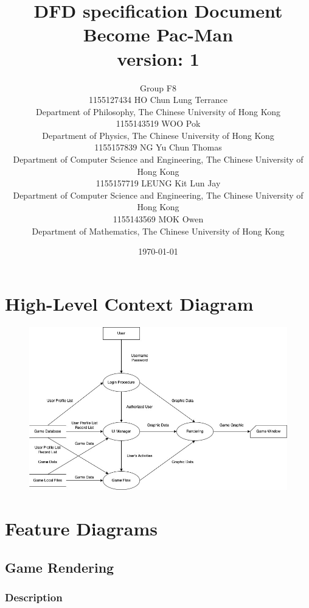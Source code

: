 \documentclass[11pt]{article}
\title{DFD specification Document\\Become Pac-Man\\version: 1}
\author{Group F8\\1155127434 HO Chun Lung Terrance\\
Department of Philosophy, The Chinese University of Hong Kong\\1155143519 WOO Pok\\
Department of Physics, The Chinese University of Hong Kong\\1155157839 NG Yu Chun Thomas\\
Department of Computer Science and Engineering, The Chinese University of Hong Kong\\1155157719 LEUNG Kit Lun Jay\\
Department of Computer Science and Engineering, The Chinese University of Hong Kong\\1155143569 MOK Owen\\
Department of Mathematics, The Chinese University of Hong Kong}
\date{\today}
\begin{document}
\maketitle
\tableofcontents
\newpage

\section{High-Level Context Diagram}
\begin{figure}[H]
    \centering
    \includegraphics*[scale=0.5]{HLCDFD.jpg}
\end{figure}
\section{Feature Diagrams}
\subsection{Game Rendering}
\subsubsection{Description}
\end{document}
